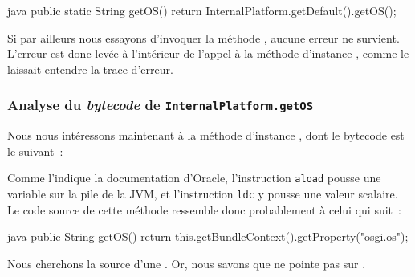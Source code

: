 \begin{imtaCode}{java}
public static String getOS() {
    return InternalPlatform.getDefault().getOS();
}
\end{imtaCode}

Si par ailleurs nous essayons d'invoquer la méthode , aucune erreur ne survient.
L'erreur est donc levée à l'intérieur de l'appel à la méthode d'instance , comme le laissait entendre la trace d'erreur.


\subsubsection{Analyse du \textit{bytecode} de \texttt{InternalPlatform.getOS}}

Nous nous intéressons maintenant à la méthode d'instance , dont le bytecode est le suivant~:


Comme l'indique la documentation d'Oracle, l'instruction \texttt{aload} \cite{javaaload} pousse une variable sur la pile de la JVM, et l'instruction %
\texttt{ldc} \cite{javaldc} y pousse une valeur scalaire.
Le code source de cette méthode ressemble donc probablement à celui qui suit~:

\begin{imtaCode}{java}
public String getOS() {
    return this.getBundleContext().getProperty("osgi.os");
}
\end{imtaCode}

Nous cherchons la source d'une .
Or, nous savons que  ne pointe pas sur .
